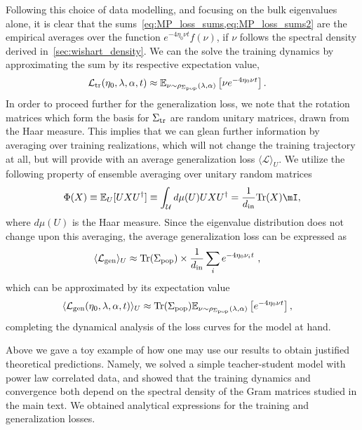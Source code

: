 \documentclass{article}
\DeclareMathOperator{\tr}{tr}
\def\tr{\textrm{Tr}}
\begin{document}
Following this choice of data modelling, and focusing on the bulk eigenvalues alone, it is clear that the sums~\cref{eq:MP_loss_sums,eq:MP_loss_sums2} are the empirical averages over the function $e^{-4 \eta_0 \nu t} f(\nu)$, if $\nu$ follows the spectral density derived in~\cref{sec:wishart_density}. 
We can the solve the training dynamics by approximating the sum by its respective expectation value,
\begin{align}
\label{eq:train_loss_anal}
  \mathcal{L}_{\mathrm{tr}}(\eta_0, \lambda,\alpha, t) &\approx
  \mathbb{E}_{\nu\sim \rho_{\Sigma_{\mathrm{pop}}}(\lambda,\alpha)}\left[ \nu e^{-4\eta_0  \nu t}\right]
  .
\end{align}
In order to proceed further for the generalization loss, we note that the rotation matrices which form the basis for $\Sigma_{\mathrm{tr}}$ are random unitary matrices, drawn from the Haar measure. This implies that we can glean further information by averaging over training realizations, which will not change the training trajectory at all, but will provide with an average generalization loss $\langle \mathcal{L} \rangle_U$. We utilize the following property of ensemble averaging over unitary random matrices~\cite{Nielsen_2002}
\begin{align}
  \Phi(X) \equiv \mathbb{E}_U[U X U^\dagger] \equiv \int_\mathcal{U} d\mu(U) U X U^\dagger  
  =
   \frac{1}{\din} \tr{(X)}\mI,
\end{align}
where $d\mu(U)$ is the Haar measure.
Since the eigenvalue distribution does not change upon this averaging, the average generalization loss can be expressed as
\begin{align}
        \langle \mathcal{L}_\gen \rangle_U 
        &\approx 
    {\tr( {\Sigma}_{\pop})}
    \times \frac{1}{\din} \sum_{i } e^{-4 \eta_0 \nu_i  t} 
    \ ,
\end{align}
which can be approximated by its expectation value
\begin{align}
     \langle \mathcal{L}_\gen(\eta_0, \lambda,\alpha, t) \rangle_U 
      &\approx
  \tr( {\Sigma}_{\pop})
  \mathbb{E}_{\nu\sim \rho_{\Sigma_\pop}(\lambda,\alpha)}
  \left[  e^{-4\eta_0  \nu t}\right],
\end{align}
completing the dynamical analysis of the loss curves for the model at hand.


Above we gave a toy example of how one may use our results to obtain justified theoretical predictions. Namely, we solved a simple teacher-student model with power law correlated data, and showed that the training dynamics and convergence both depend on the spectral density of the Gram matrices studied in the main text. We obtained analytical expressions for the training and generalization losses.
\end{document}
